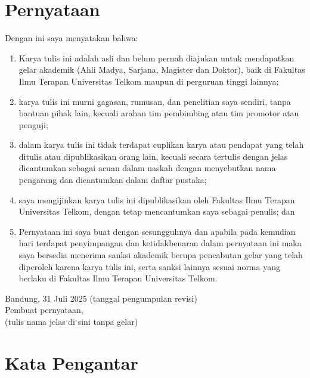 \documentclass[a4paper,11pt,oneside]{report}
\begin{document}
\chapter*{Pernyataan}

Dengan ini saya menyatakan bahwa:
\begin{enumerate}[label=\arabic*.]
    \item Karya tulis ini adalah asli dan belum pernah diajukan untuk mendapatkan
    gelar akademik (Ahli Madya, Sarjana, Magister dan Doktor), baik di Fakultas
    Ilmu Terapan Universitas Telkom maupun di perguruan tinggi lainnya;
    \item karya tulis ini murni gagasan, rumusan, dan penelitian saya sendiri,
    tanpa bantuan pihak lain, kecuali arahan tim pembimbing atau tim promotor
    atau penguji;
    \item dalam karya tulis ini tidak terdapat cuplikan karya atau pendapat yang
    telah ditulis atau dipublikasikan orang lain, kecuali secara tertulis dengan
    jelas dicantumkan sebagai acuan dalam naskah dengan menyebutkan nama
    pengarang dan dicantumkan dalam daftar pustaka;
    \item saya mengijinkan karya tulis ini dipublikasikan oleh Fakultas Ilmu
    Terapan Universitas Telkom, dengan tetap mencantumkan saya sebagai penulis;
    dan
    \item Pernyataan ini saya buat dengan sesungguhnya dan apabila pada kemudian
    hari terdapat penyimpangan dan ketidakbenaran dalam pernyataan ini maka saya
    bersedia menerima sanksi akademik berupa pencabutan gelar yang telah
    diperoleh karena karya tulis ini, serta sanksi lainnya sesuai norma yang
    berlaku di Fakultas Ilmu Terapan Universitas Telkom.
\end{enumerate}

\vspace{2cm}
\begin{flushright}
    Bandung, 31 Juli 2025 (tanggal pengumpulan revisi)\\[6pt]
    Pembuat pernyataan,\\[3cm]
    (tulis nama jelas di sini tanpa gelar)
\end{flushright}

\chapter*{Kata Pengantar}
\end{document}
